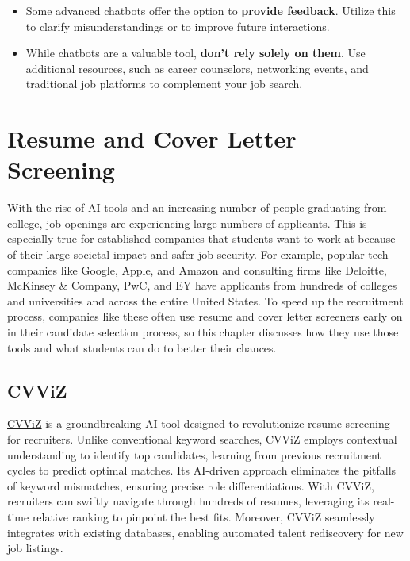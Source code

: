\documentclass[
]{book}
\begin{document}
\begin{itemize}
\item
  Some advanced chatbots offer the option to \textbf{provide feedback}. Utilize this to clarify misunderstandings or to improve future interactions.
\item
  While chatbots are a valuable tool, \textbf{don't rely solely on them}. Use additional resources, such as career counselors, networking events, and traditional job platforms to complement your job search.
\end{itemize}

\hypertarget{resume-and-cover-letter-screening}{%
\chapter{Resume and Cover Letter Screening}\label{resume-and-cover-letter-screening}}

With the rise of AI tools and an increasing number of people graduating from college, job openings are experiencing large numbers of applicants. This is especially true for established companies that students want to work at because of their large societal impact and safer job security. For example, popular tech companies like Google, Apple, and Amazon and consulting firms like Deloitte, McKinsey \& Company, PwC, and EY have applicants from hundreds of colleges and universities and across the entire United States. To speed up the recruitment process, companies like these often use resume and cover letter screeners early on in their candidate selection process, so this chapter discusses how they use those tools and what students can do to better their chances.

\hypertarget{cvviz}{%
\section{CVViZ}\label{cvviz}}

\href{https://cvviz.com/product/resume-screening/}{CVViZ} is a groundbreaking AI tool designed to revolutionize resume screening for recruiters. Unlike conventional keyword searches, CVViZ employs contextual understanding to identify top candidates, learning from previous recruitment cycles to predict optimal matches. Its AI-driven approach eliminates the pitfalls of keyword mismatches, ensuring precise role differentiations. With CVViZ, recruiters can swiftly navigate through hundreds of resumes, leveraging its real-time relative ranking to pinpoint the best fits. Moreover, CVViZ seamlessly integrates with existing databases, enabling automated talent rediscovery for new job listings.~
\end{document}
